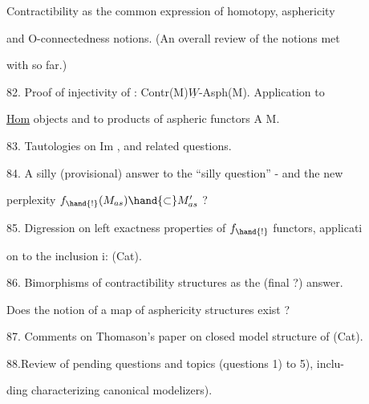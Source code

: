  Contractibility as the common expression of homotopy,  asphericity\par
and O-connectedness notions. (An overall review of the notions met\par
with so far.)\par

82. Proof of injectivity of \hand{$\alpha$}: Contr(M)\hand{$\hookrightarrow$}$\underline{W}$-Asph(M). Application to\par
\underline{Hom} objects and to products of aspheric functors A\hand{$\longrightarrow$} M.\par

83. Tautologies on Im \hand{$\alpha$},  and related questions.\par

84. A silly (provisional) answer to the ``silly question'' - and the new\par
perplexity  $f_{\hand{!}}(M_{as})\hand{\subset}M'_{as}$  ?\par

85. Digression on left exactness properties of $f_{\hand{!}}$ functors,  applicati\par
on to the inclusion i: \hand{$\Delta$}\hand{$\hookrightarrow$}(Cat).\par

86. Bimorphisms of contractibility structures as the (final ?) answer.\par
Does the notion of a map of asphericity structures exist ?\par

\par
87. Comments on Thomason's paper on closed model structure of (Cat).\par

88.\hand{(}Review of pending questions and topics  (questions 1) to 5), inclu-\par%
ding characterizing canonical modelizers).\par

